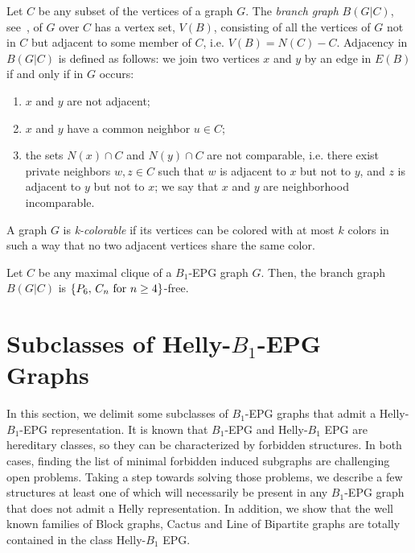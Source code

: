 Let $C$ be any subset of the vertices of a graph $G$. The \textit{branch graph} $B(G|C)$, see~\cite{golumbic2009}, of $G$ over $C$ has a vertex set, $V(B)$, consisting of all the vertices of $G$ not in $C$ but adjacent to some member of $C$, i.e. $V(B) = N(C) - C$. Adjacency in $B(G|C)$ is defined as follows: we join two vertices $x$ and $y$ by an edge in $E(B)$ if and only if in $G$ occurs:
\begin{enumerate}
    \item  $x$ and $y$ are not adjacent;
    \item $x$ and $y$ have a common neighbor $u \in C$;
    \item the sets $N(x) \cap C$ and $N(y) \cap C$ are not comparable, i.e. there exist private neighbors $w, z \in C$ such that $w$ is adjacent to $x$ but not to $y$, and $z$ is adjacent to $y$ but not to $x$; we say that $x$ and $y$ are neighborhood incomparable.
\end{enumerate}

A graph $G$ is \textit{k-colorable} if its vertices can be colored with at most $k$ colors in such a way that no two adjacent vertices share the same color. 

\begin{lema} \label{l:branch} Let $C$ be any maximal clique of a $B_1$-EPG  graph $G$. Then, the branch graph $B(G|C)$ is $\{P_6, \, C_n \hbox{ for }  n\geq 4\}$-free.
\end{lema}







\section{Subclasses of Helly-$B_1$-EPG Graphs}

In this section, we delimit some  subclasses of $B_1$-EPG graphs that admit a Helly-$B_1$-EPG representation. It is known that $B_1$-EPG and Helly-$B_1$ EPG 
are hereditary classes, so they can  be characterized by forbidden structures. 
In both cases, finding the list of minimal forbidden induced subgraphs are challenging open problems.
Taking a step towards solving
those problems,  we describe a few structures %
at least one of which will  necessarily be present in  any $B_1$-EPG graph that does not admit a Helly representation. 
In addition,
we show that the well known families of Block graphs, Cactus and Line of Bipartite graphs are totally contained in the class Helly-$B_1$ EPG.


